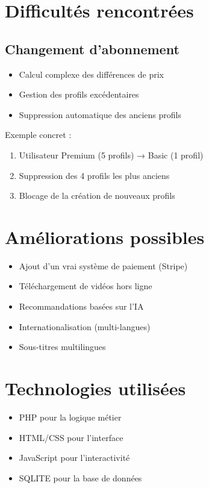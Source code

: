 \documentclass[12pt,a4paper]{article}
\begin{document}
\section{Difficultés rencontrées}
\subsection{Changement d'abonnement}
\begin{itemize}
\item Calcul complexe des différences de prix
\item Gestion des profils excédentaires
\item Suppression automatique des anciens profils
\end{itemize}

Exemple concret : 
\begin{enumerate}
\item Utilisateur Premium (5 profils) → Basic (1 profil)
\item Suppression des 4 profils les plus anciens
\item Blocage de la création de nouveaux profils
\end{enumerate}

\section{Améliorations possibles}
\begin{itemize}
\item Ajout d'un vrai système de paiement (Stripe)
\item Téléchargement de vidéos hors ligne
\item Recommandations basées sur l'IA
\item Internationalisation (multi-langues)
\item Sous-titres multilingues
\end{itemize}

\section{Technologies utilisées}
\begin{itemize}
\item PHP pour la logique métier
\item HTML/CSS pour l'interface
\item JavaScript pour l'interactivité
\item SQLITE pour la base de données
\end{itemize}
\end{document}
